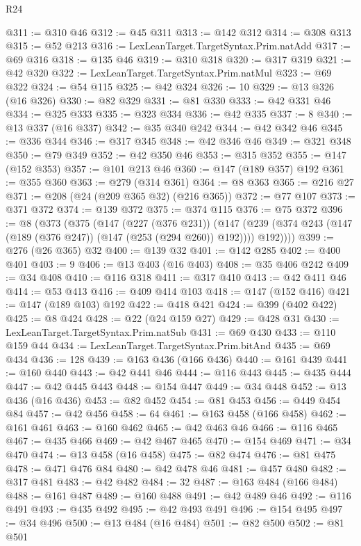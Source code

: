 \begin{lexlean}{R24}
\begin{coremodule}
@311 := @310 @46
@312 := @45 @311
@313 := @142 @312
@314 := @308 @313
@315 := @52 @213
@316 := LexLeanTarget.TargetSyntax.Prim.natAdd
@317 := @69 @316
@318 := @135 @46
@319 := @310 @318
@320 := @317 @319
@321 := @42 @320
@322 := LexLeanTarget.TargetSyntax.Prim.natMul
@323 := @69 @322
@324 := @54 @115
@325 := @42 @324
@326 := 10
@329 := @13 @326 (@16 @326)
@330 := @82 @329
@331 := @81 @330
@333 := @42 @331 @46
@334 := @325 @333
@335 := @323 @334
@336 := @42 @335
@337 := 8
@340 := @13 @337 (@16 @337)
@342 := @35 @340 @242
@344 := @42 @342 @46
@345 := @336 @344
@346 := @317 @345
@348 := @42 @346 @46
@349 := @321 @348
@350 := @79 @349
@352 := @42 @350 @46
@353 := @315 @352
@355 := @147 (@152 @353)
@357 := @101 @213 @46
@360 := @147 (@189 @357) @192
@361 := @355 @360
@363 := @279 (@314 @361)
@364 := @8 @363
@365 := @216 @27
@371 := @208 (@24 (@209 @365 @32) (@216 @365))
@372 := @77 @107
@373 := @371 @372
@374 := @139 @372
@375 := @374 @115
@376 := @75 @372
@396 := @8
    (@373
      (@375
        (@147
          (@227 (@376 @231))
          (@147 (@239 (@374 @243 (@147 (@189 (@376 @247)) (@147 (@253 (@294 @260)) @192)))) @192))))
@399 := @276 (@26 @365) @32
@400 := @139 @32
@401 := @142 @285
@402 := @400 @401
@403 := 9
@406 := @13 @403 (@16 @403)
@408 := @35 @406 @242
@409 := @34 @408
@410 := @116 @318
@411 := @317 @410
@413 := @42 @411 @46
@414 := @53 @413
@416 := @409 @414 @103
@418 := @147 (@152 @416)
@421 := @147 (@189 @103) @192
@422 := @418 @421
@424 := @399 (@402 @422)
@425 := @8 @424
@428 := @22 (@24 @159 @27)
@429 := @428 @31
@430 := LexLeanTarget.TargetSyntax.Prim.natSub
@431 := @69 @430
@433 := @110 @159 @44
@434 := LexLeanTarget.TargetSyntax.Prim.bitAnd
@435 := @69 @434
@436 := 128
@439 := @163 @436 (@166 @436)
@440 := @161 @439
@441 := @160 @440
@443 := @42 @441 @46
@444 := @116 @443
@445 := @435 @444
@447 := @42 @445 @443
@448 := @154 @447
@449 := @34 @448
@452 := @13 @436 (@16 @436)
@453 := @82 @452
@454 := @81 @453
@456 := @449 @454 @84
@457 := @42 @456
@458 := 64
@461 := @163 @458 (@166 @458)
@462 := @161 @461
@463 := @160 @462
@465 := @42 @463 @46
@466 := @116 @465
@467 := @435 @466
@469 := @42 @467 @465
@470 := @154 @469
@471 := @34 @470
@474 := @13 @458 (@16 @458)
@475 := @82 @474
@476 := @81 @475
@478 := @471 @476 @84
@480 := @42 @478 @46
@481 := @457 @480
@482 := @317 @481
@483 := @42 @482
@484 := 32
@487 := @163 @484 (@166 @484)
@488 := @161 @487
@489 := @160 @488
@491 := @42 @489 @46
@492 := @116 @491
@493 := @435 @492
@495 := @42 @493 @491
@496 := @154 @495
@497 := @34 @496
@500 := @13 @484 (@16 @484)
@501 := @82 @500
@502 := @81 @501

\end{coremodule}
\end{lexlean}
